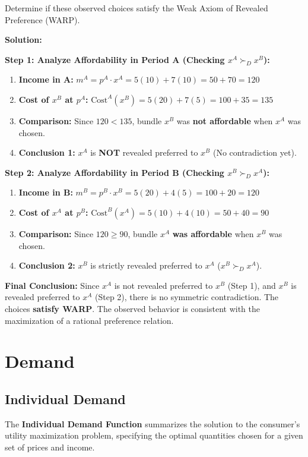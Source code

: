 \documentclass{article}
\begin{document}
Determine if these observed choices satisfy the Weak Axiom of Revealed Preference (WARP).

\textbf{Solution:}

\textbf{Step 1: Analyze Affordability in Period A (Checking $x^A \succ_D x^B$):}
\begin{enumerate}
    \item \textbf{Income in A:} $m^A = p^A \cdot x^A = 5(10) + 7(10) = 50 + 70 = 120$
    \item \textbf{Cost of $x^B$ at $p^A$:} $\text{Cost}^A(x^B) = 5(20) + 7(5) = 100 + 35 = 135$
    \item \textbf{Comparison:} Since $120 < 135$, bundle $x^B$ was \textbf{not affordable} when $x^A$ was chosen.
    \item \textbf{Conclusion 1:} $x^A$ is \textbf{NOT} revealed preferred to $x^B$ (No contradiction yet).
\end{enumerate}

\textbf{Step 2: Analyze Affordability in Period B (Checking $x^B \succ_D x^A$):}
\begin{enumerate}
    \item \textbf{Income in B:} $m^B = p^B \cdot x^B = 5(20) + 4(5) = 100 + 20 = 120$
    \item \textbf{Cost of $x^A$ at $p^B$:} $\text{Cost}^B(x^A) = 5(10) + 4(10) = 50 + 40 = 90$
    \item \textbf{Comparison:} Since $120 \geq 90$, bundle $x^A$ \textbf{was affordable} when $x^B$ was chosen.
    \item \textbf{Conclusion 2:} $x^B$ is strictly revealed preferred to $x^A$ ($x^B \succ_D x^A$).
\end{enumerate}

\textbf{Final Conclusion:} Since $x^A$ is not revealed preferred to $x^B$ (Step 1), and $x^B$ is revealed preferred to $x^A$ (Step 2), there is no symmetric contradiction. The choices \textbf{satisfy WARP}. The observed behavior is consistent with the maximization of a rational preference relation.
\pagebreak
\section{Demand}
\subsection{Individual Demand}

The \textbf{Individual Demand Function} summarizes the solution to the consumer's utility maximization problem, specifying the optimal quantities chosen for a given set of prices and income.
\end{document}
